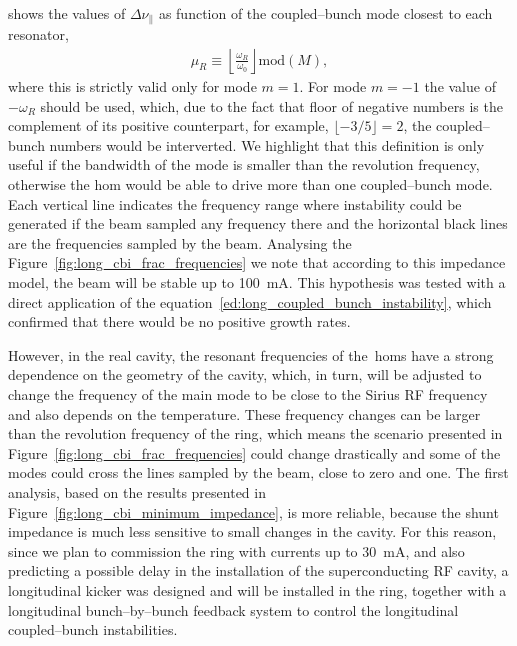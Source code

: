    shows the values of $\Delta\nu_\parallel$ as function of the coupled--bunch mode closest to each resonator,
    \begin{align}
        \mu_R \equiv \left\lfloor\frac{\omega_R}{\omega_0}\right\rfloor \text{mod}(M),
    \end{align}
    where this is strictly valid only for mode $m=1$. For mode $m=-1$ the value of $-\omega_R$ should be used, which, due to the fact that floor of negative numbers is the complement of its positive counterpart, for example, $\lfloor -3/5 \rfloor=2$, the coupled--bunch numbers would be interverted. We highlight that this definition is only useful if the bandwidth of the mode is smaller than the revolution frequency, otherwise the \gls{hom} would be able to drive more than one coupled--bunch mode. Each vertical line indicates the frequency range where instability could be generated if the beam sampled any frequency there and the horizontal black lines are the frequencies sampled by the beam.
    Analysing the Figure~\ref{fig:long_cbi_frac_frequencies} we note that according to this impedance model, the beam will be stable up to \SI{100}{\milli\ampere}. This hypothesis was tested with a direct application of the equation~\eqref{ed:long_coupled_bunch_instability}, which confirmed that there would be no positive growth rates.

    However, in the real cavity, the resonant frequencies of the~\glspl{hom} have a strong dependence on the geometry of the cavity, which, in turn, will be adjusted to change the frequency of the main mode to be close to the Sirius RF frequency and also depends on the temperature. These frequency changes can be larger than the revolution frequency of the ring, which means the scenario presented in Figure~\ref{fig:long_cbi_frac_frequencies} could change drastically and some of the modes could cross the lines sampled by the beam, close to zero and one. The first analysis, based on the results presented in Figure~\ref{fig:long_cbi_minimum_impedance}, is more reliable, because the shunt impedance is much less sensitive to small changes in the cavity. For this reason, since we plan to commission the ring with currents up to \SI{30}{\milli\ampere}, and also predicting a possible delay in the installation of the superconducting RF cavity, a longitudinal kicker was designed and will be installed in the ring, together with a longitudinal bunch--by--bunch feedback system to control the longitudinal coupled--bunch instabilities.


